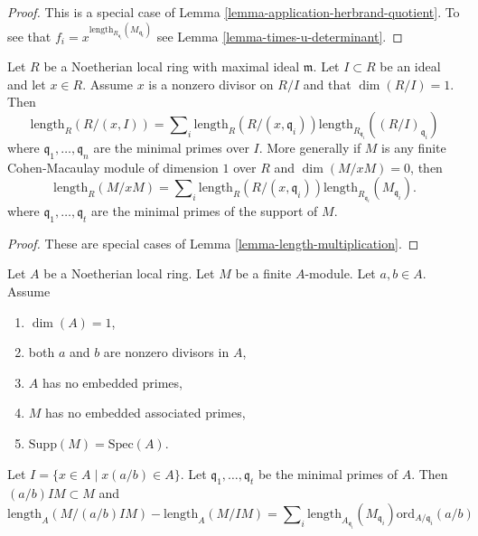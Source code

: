\begin{proof}
This is a special case of Lemma \ref{lemma-application-herbrand-quotient}.
To see that $f_i = x^{\text{length}_{R_{\mathfrak q_i}}(M_{\mathfrak q_i})}$
see Lemma \ref{lemma-times-u-determinant}.
\end{proof}

\begin{lemma}
\label{lemma-additivity-divisors-restricted}
Let $R$ be a Noetherian local ring with maximal ideal $\mathfrak m$.
Let $I \subset R$ be an ideal and let $x \in R$.
Assume $x$ is a nonzero divisor on $R/I$ and that $\dim(R/I) = 1$.
Then
$$
\text{length}_R(R/(x, I))
=
\sum\nolimits_i \text{length}_R(R/(x, \mathfrak q_i))
\text{length}_{R_{\mathfrak q_i}}((R/I)_{\mathfrak q_i})
$$
where $\mathfrak q_1, \ldots, \mathfrak q_n$ are the minimal
primes over $I$. More generally if $M$ is any finite Cohen-Macaulay
module of dimension $1$ over $R$ and $\dim(M/xM) = 0$, then
$$
\text{length}_R(M/xM)
=
\sum\nolimits_i \text{length}_R(R/(x, \mathfrak q_i))
\text{length}_{R_{\mathfrak q_i}}(M_{\mathfrak q_i}).
$$
where $\mathfrak q_1, \ldots, \mathfrak q_t$ are the
minimal primes of the support of $M$.
\end{lemma}

\begin{proof}
These are special cases of Lemma \ref{lemma-length-multiplication}.
\end{proof}

\begin{lemma}
\label{lemma-no-embedded-points-modules}
Let $A$ be a Noetherian local ring.
Let $M$ be a finite $A$-module.
Let $a, b \in A$.
Assume
\begin{enumerate}
\item $\dim(A) = 1$,
\item both $a$ and $b$ are nonzero divisors in $A$,
\item $A$ has no embedded primes,
\item $M$ has no embedded associated primes,
\item $\text{Supp}(M) = \text{Spec}(A)$.
\end{enumerate}
Let $I = \{x \in A \mid x(a/b) \in A\}$.
Let $\mathfrak q_1, \ldots, \mathfrak q_t$ be the minimal
primes of $A$. Then $(a/b)IM \subset M$ and
$$
\text{length}_A(M/(a/b)IM)
-
\text{length}_A(M/IM)
=
\sum\nolimits_i
\text{length}_{A_{\mathfrak q_i}}(M_{\mathfrak q_i})
\text{ord}_{A/\mathfrak q_i}(a/b)
$$
\end{lemma}

